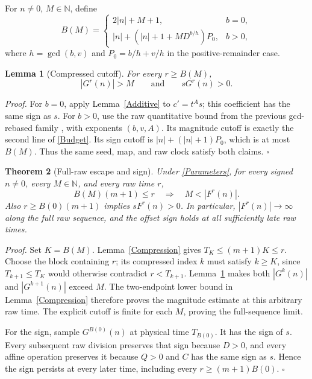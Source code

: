 \documentclass[11pt,letterpaper]{article}
\newcommand{\N}{\mathbb{N}}
\newtheorem{theorem}{Theorem}
\newtheorem{lemma}[theorem]{Lemma}
\newenvironment{proof}{\noindent\textit{Proof.}}{\hfill\(\square\)}
\begin{document}
For \(n\ne0\), \(M\in\N\), define
\begin{equation}\label{Budget}
B(M)=
\begin{cases}
2|n|+M+1,&b=0,\\
|n|+(|n|+1+MD^{b/h})P_0,&b>0,
\end{cases}
\end{equation}
where \(h=\gcd(b,v)\) and \(P_0=b/h+v/h\) in the positive-remainder case.

\begin{lemma}[Compressed cutoff]\label{CompressedBudget}
For every \(r\ge B(M)\),
\[
|G^r(n)|>M\qquad\text{and}\qquad sG^r(n)>0.
\]
\end{lemma}
\begin{proof}
For \(b=0\), apply Lemma~\ref{Additive} to \(c'=t^A s\); this coefficient
has the same sign as \(s\). For \(b>0\), use the raw quantitative bound
from the previous gcd-rebased family \cite{AscendRebasing}, with exponents
\((b,v,A)\). Its magnitude cutoff is exactly the second line of
\eqref{Budget}. Its sign cutoff is
\(|n|+(|n|+1)P_0\), which is at most \(B(M)\). Thus the same seed, map,
and raw clock satisfy both claims.
\end{proof}

\begin{theorem}[Full-raw escape and sign]\label{Escape}
Under \eqref{Parameters}, for every signed \(n\ne0\), every \(M\in\N\),
and every raw time \(r\),
\[
B(M)(m+1)\le r\quad\Longrightarrow\quad M<|F^r(n)|.
\]
Also \(r\ge B(0)(m+1)\) implies \(sF^r(n)>0\). In particular,
\(|F^r(n)|\to\infty\) along the full raw sequence, and the offset sign
holds at all sufficiently late raw times.
\end{theorem}
\begin{proof}
Set \(K=B(M)\). Lemma~\ref{Compression} gives \(T_K\le(m+1)K\le r\).
Choose the block containing \(r\); its compressed index \(k\) must satisfy
\(k\ge K\), since \(T_{k+1}\le T_K\) would otherwise contradict
\(r<T_{k+1}\). Lemma~\ref{CompressedBudget} makes both
\(|G^k(n)|\) and \(|G^{k+1}(n)|\) exceed \(M\).
The two-endpoint lower bound in Lemma~\ref{Compression} therefore proves
the magnitude estimate at this arbitrary raw time. The explicit cutoff
is finite for each \(M\), proving the full-sequence limit.

For the sign, sample \(G^{B(0)}(n)\) at physical time \(T_{B(0)}\).
It has the sign of \(s\). Every subsequent raw division preserves that
sign because \(D>0\), and every affine operation preserves it because
\(Q>0\) and \(C\) has the same sign as \(s\).
Hence the sign persists at every later time, including every
\(r\ge(m+1)B(0)\).
\end{proof}
\end{document}

